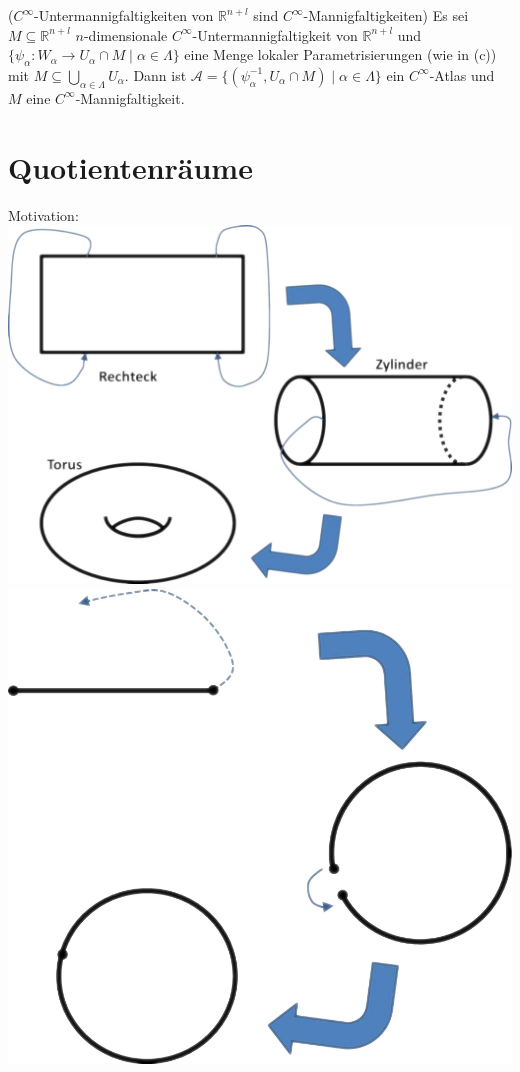 \documentclass[a4paper,11pt,notitlepage]{report}
\theoremstyle{definition}
\newcommand{\R}{{\ensuremath{\mathbb{R}}}}
\begin{document}
\begin{theorem}{($C^\infty$-Untermannigfaltigkeiten von $\R^{n+l}$ sind $C^\infty$-Mannigfaltigkeiten)}
	Es sei $M \subseteq \R^{n+l}$ $n$-dimensionale $C^\infty$-Untermannigfaltigkeit von $\R^{n+l}$ und $\{\psi_\alpha \colon W_\alpha \rightarrow U_\alpha \cap M \mid \alpha \in \Lambda\}$ eine Menge lokaler Parametrisierungen (wie in (c)) mit $M \subseteq \bigcup\limits_{\alpha \in \Lambda}{U_\alpha}$.
	Dann ist $\mathcal{A} = \{(\psi_\alpha^{-1}, U_\alpha \cap M) \mid \alpha \in \Lambda\}$ ein $C^\infty$-Atlas und $M$ eine $C^\infty$-Mannigfaltigkeit.
\end{theorem}

\newpage
\section{Quotientenräume}
Motivation:\newline
\includegraphics[scale=0.6]{images/Identifizierung1.png}\newline
\includegraphics[scale=0.6]{images/Identifizierung2.png}\newline
\end{document}
